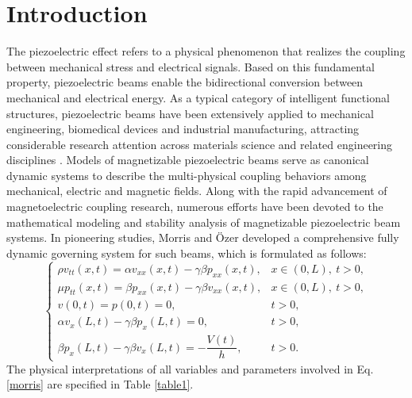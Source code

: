 \documentclass[12pt,reqno]{article}
\let\Section=\section
\def\section{\setcounter{equation}{0}\Section}
\begin{document}
	\section{Introduction}\label{sec1}
The piezoelectric effect refers to a physical phenomenon that realizes the coupling between mechanical stress and electrical signals. Based on this fundamental property, piezoelectric beams enable the bidirectional conversion between mechanical and electrical energy. As a typical category of intelligent functional structures, piezoelectric beams have been extensively applied to mechanical engineering, biomedical devices and industrial manufacturing, attracting considerable research attention across materials science and related engineering disciplines \cite{Dagdeviren2016,s18113973,9164928}.
Models of magnetizable piezoelectric beams serve as canonical dynamic systems to describe the multi-physical coupling behaviors among mechanical, electric and magnetic fields. Along with the rapid advancement of magnetoelectric coupling research, numerous efforts have been devoted to the mathematical modeling and stability analysis of magnetizable piezoelectric beam systems. In pioneering studies, Morris and \"Ozer \cite{Morris2013,Morris2014,Ozer2015} developed a comprehensive fully dynamic governing system for such beams, which is formulated as follows:
\begin{equation}\label{morris}
			\begin{cases}
				\rho v_{tt}(x,t) = \alpha v_{xx}(x,t) - \gamma\beta p_{xx}(x,t), & x\in(0,L),\ t>0, \\[4pt]
				\mu p_{tt}(x,t) = \beta p_{xx}(x,t) - \gamma\beta v_{xx}(x,t), & x\in(0,L),\ t>0, \\[4pt]
				v(0,t) = p(0,t) = 0, & t>0, \\[4pt]
				\alpha v_x(L,t) - \gamma\beta p_x(L,t) = 0, & t>0, \\[4pt]
				\beta p_x(L,t) - \gamma\beta v_x(L,t) = -\dfrac{V(t)}{h}, & t>0.
			\end{cases}
		\end{equation}
The physical interpretations of all variables and parameters involved in Eq. \eqref{morris} are specified in Table \ref{table1}.
\end{document}
